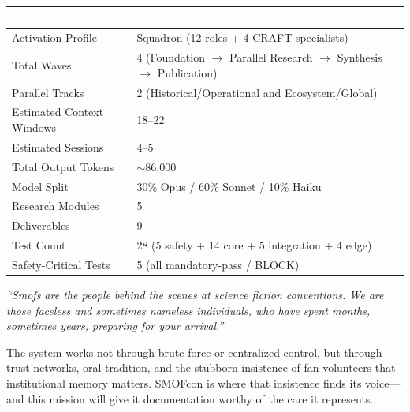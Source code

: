 \documentclass[11pt,letterpaper]{article}
\newcommand{\tableheader}[1]{\textbf{\sffamily\textcolor{white}{#1}}}
\begin{document}
\begin{center}
\begin{tabularx}{\textwidth}{L{4.5cm}X}
\toprule
{}
\tableheader{Metric} & \tableheader{Value} \\
\midrule
Activation Profile & Squadron (12 roles + 4 CRAFT specialists) \\
Total Waves & 4 (Foundation $\rightarrow$ Parallel Research $\rightarrow$ Synthesis $\rightarrow$ Publication) \\
Parallel Tracks & 2 (Historical/Operational and Ecosystem/Global) \\
Estimated Context Windows & 18--22 \\
Estimated Sessions & 4--5 \\
Total Output Tokens & $\sim$86,000 \\
Model Split & 30\% Opus / 60\% Sonnet / 10\% Haiku \\
Research Modules & 5 \\
Deliverables & 9 \\
Test Count & 28 (5 safety + 14 core + 5 integration + 4 edge) \\
Safety-Critical Tests & 5 (all mandatory-pass / BLOCK) \\
\bottomrule
\end{tabularx}
\end{center}

\begin{quotebox}
\textit{``Smofs are the people behind the scenes at science fiction conventions. We are those faceless and sometimes nameless individuals, who have spent months, sometimes years, preparing for your arrival.''}

\vspace{0.5em}

The system works not through brute force or centralized control, but through trust networks, oral tradition, and the stubborn insistence of fan volunteers that institutional memory matters. SMOFcon is where that insistence finds its voice---and this mission will give it documentation worthy of the care it represents.
\end{quotebox}
\end{document}
